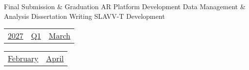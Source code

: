 \vfill{\centering{} \small{Final Submission \& Graduation}\hspace{ 1.5em } \small{AR Platform Development}\hspace{ 1.5em } \small{Data Management \& Analysis}\hspace{ 1.5em } \small{Dissertation Writing}\hspace{ 1.5em } \small{SLAVV-T Development}\hspace{ 1.5em }\par}

\pagebreak
{\noindent\Large\renewcommand{\arraystretch}{\myNumArrayStretch}\begin{tabular}{|l|l|l}
\hyperlink{2027}{2027} & \hyperlink{Q1}{Q1} & \hyperlink{March}{March}
\end{tabular}\hfill%
\begin{tabular}{r|r@{}}
\hyperlink{month-2027-2}{February} & \hyperlink{month-2027-4}{April}
\end{tabular}}
\myLineThick
